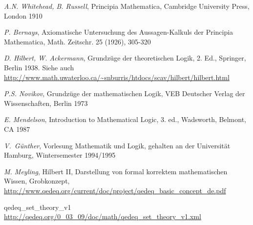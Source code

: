 \documentclass[a4paper,german,10pt,twoside]{book}
\theoremstyle{definition}
\theoremstyle{remark}
\begin{document}
\begin{thebibliography}{99}
 \emph{A.N. Whitehead, B. Russell}, Principia Mathematica, Cambridge University Press, London 1910

 \emph{P. Bernays}, Axiomatische Untersuchung des Aussagen-Kalkuls der {\glqq Principia Mathematica\grqq}, Math. Zeitschr. 25 (1926), 305-320

 \emph{D. Hilbert, W. Ackermann}, Grundz{\"u}ge der theoretischen Logik, 2. Ed., Springer, Berlin 1938. Siehe auch \url{http://www.math.uwaterloo.ca/~snburris/htdocs/scav/hilbert/hilbert.html}

 \emph{P.S. Novikov}, Grundz{\"u}ge der mathematischen Logik, VEB Deutscher Verlag der Wissenschaften, Berlin 1973

 \emph{E. Mendelson}, Introduction to Mathematical Logic, 3. ed., Wadsworth, Belmont, CA 1987

 \emph{V.~G{\"u}nther}, Vorlesung {\glqq Mathematik und Logik\grqq}, gehalten an der Universit{\"a}t Hamburg, Wintersemester 1994/1995

 \emph{M. Meyling}, Hilbert II, Darstellung von formal korrektem mathematischen Wissen, Grobkonzept, \url{http://www.qedeq.org/current/doc/project/qedeq_basic_concept_de.pdf}



 qedeq\_set\_theory\_v1 \url{http://qedeq.org/0_03_09/doc/math/qedeq_set_theory_v1.xml}


\end{thebibliography}
\backmatter

 \printindex
\end{document}

